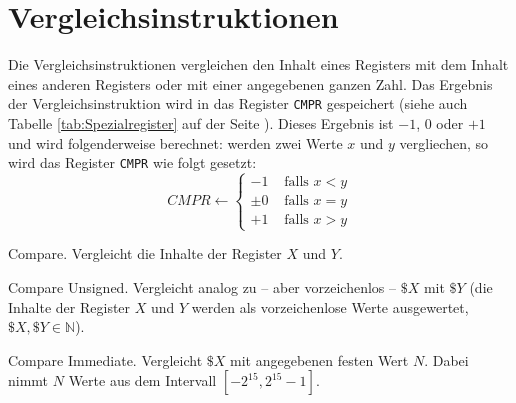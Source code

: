 \section{Vergleichsinstruktionen}
\label{sec:Vergleichsinstruktionen}

Die Vergleichsinstruktionen vergleichen den Inhalt eines Registers mit dem
Inhalt eines anderen Registers oder mit einer angegebenen ganzen Zahl. Das
Ergebnis der Vergleichsinstruktion wird in das Register \texttt{CMPR}
gespeichert (siehe auch Tabelle \ref{tab:Spezialregister} auf der Seite
\pageref{tab:Spezialregister}). Dieses Ergebnis ist $-1$, $0$ oder $+1$ und wird
folgenderweise berechnet: werden zwei Werte $x$ und $y$ vergliechen, so wird das
Register \texttt{CMPR} wie folgt gesetzt:
\[
    CMPR \gets
    \begin{cases}
        -1 & \text{ falls } x < y  \\
     \pm 0 & \text{ falls } x = y  \\
        +1 & \text{ falls } x > y 
    \end{cases}
\]

\glqq Compare\grqq.
Vergleicht die Inhalte der Register $X$ und $Y$.


\glqq Compare Unsigned\grqq.
Vergleicht analog zu  -- aber vorzeichenlos -- $\$X$ mit $\$Y$
(die Inhalte der Register $X$ und $Y$ werden als vorzeichenlose Werte
ausgewertet, $\$X, \$Y \in \mathds{N}$).


\glqq Compare Immediate\grqq. 
Vergleicht $\$X$ mit angegebenen festen Wert $N$. Dabei nimmt $N$ Werte aus dem
Intervall $[-2^{15}, 2^{15}-1]$.


